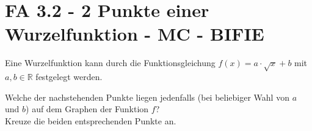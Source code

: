 \section{FA 3.2 - 2 Punkte einer Wurzelfunktion  - MC - BIFIE}


\begin{beispiel}[FA 3.2]{1} %
Eine Wurzelfunktion kann durch die Funktionsgleichung $f(x)=a\cdot \sqrt{x}+b$ mit $a,b \in \mathbb{R}$ festgelegt werden.
\leer

Welche der nachstehenden Punkte liegen jedenfalls (bei beliebiger Wahl von $a$ und $b$) auf dem Graphen der Funktion $f$? \\
Kreuze die beiden entsprechenden Punkte an.

\end{beispiel}